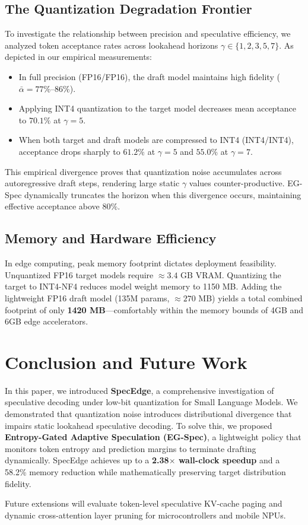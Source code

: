 \documentclass[10pt,twocolumn,letterpaper]{article}
\begin{document}
\subsection{The Quantization Degradation Frontier}
To investigate the relationship between precision and speculative efficiency, we analyzed token acceptance rates across lookahead horizons $\gamma \in \{1, 2, 3, 5, 7\}$. 
As depicted in our empirical measurements:
\begin{itemize}
    \item In full precision (FP16/FP16), the draft model maintains high fidelity ($\bar{\alpha} = 77\%$--$86\%$).
    \item Applying INT4 quantization to the target model decreases mean acceptance to $70.1\%$ at $\gamma=5$.
    \item When both target and draft models are compressed to INT4 (INT4/INT4), acceptance drops sharply to $61.2\%$ at $\gamma=5$ and $55.0\%$ at $\gamma=7$.
\end{itemize}
This empirical divergence proves that quantization noise accumulates across autoregressive draft steps, rendering large static $\gamma$ values counter-productive. EG-Spec dynamically truncates the horizon when this divergence occurs, maintaining effective acceptance above $80\%$.

\subsection{Memory and Hardware Efficiency}
In edge computing, peak memory footprint dictates deployment feasibility. Unquantized FP16 target models require $\approx 3.4$ GB VRAM. Quantizing the target to INT4-NF4 reduces model weight memory to 1150 MB. Adding the lightweight FP16 draft model (135M params, $\approx 270$ MB) yields a total combined footprint of only \textbf{1420 MB}---comfortably within the memory bounds of 4GB and 6GB edge accelerators.

\section{Conclusion and Future Work}
In this paper, we introduced \textbf{SpecEdge}, a comprehensive investigation of speculative decoding under low-bit quantization for Small Language Models. We demonstrated that quantization noise introduces distributional divergence that impairs static lookahead speculative decoding. To solve this, we proposed \textbf{Entropy-Gated Adaptive Speculation (EG-Spec)}, a lightweight policy that monitors token entropy and prediction margins to terminate drafting dynamically. SpecEdge achieves up to a \textbf{2.38$\times$ wall-clock speedup} and a 58.2\% memory reduction while mathematically preserving target distribution fidelity. 

Future extensions will evaluate token-level speculative KV-cache paging and dynamic cross-attention layer pruning for microcontrollers and mobile NPUs.



\end{document}
